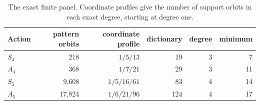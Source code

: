 \begin{table}[htbp]
\centering
\caption{The exact finite panel.  Coordinate profiles give the number of
support orbits in each exact degree, starting at degree one.}
\label{tab:exact-panel}
\begin{tabular}{lrrrrr}
\toprule
Action & pattern orbits & coordinate profile & dictionary & degree & minimum\\
\midrule
$S_4$ & 218 & $1/5/13$ & 19 & 3 & 7\\
$A_4$ & 368 & $1/7/21$ & 29 & 3 & 11\\
$S_5$ & 9,608 & $1/5/16/61$ & 83 & 4 & 14\\
$A_5$ & 17,824 & $1/6/21/96$ & 124 & 4 & 17\\
\bottomrule
\end{tabular}
\end{table}
